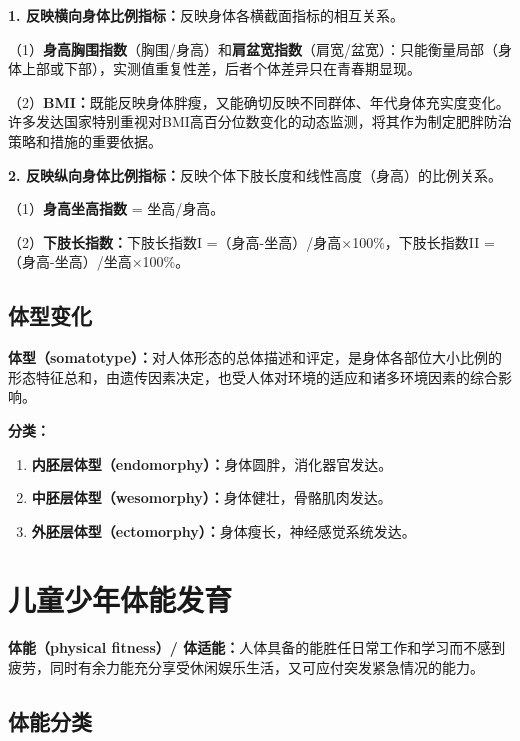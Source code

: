 \begin{keybox}
\textbf{1. 反映横向身体比例指标：}反映身体各横截面指标的相互关系。

（1）\textbf{身高胸围指数}（胸围/身高）和\textbf{肩盆宽指数}（肩宽/盆宽）：只能衡量局部（身体上部或下部），实测值重复性差，后者个体差异只在青春期显现。

（2）\textbf{BMI：}既能反映身体胖瘦，又能确切反映不同群体、年代身体充实度变化。许多发达国家特别重视对BMI高百分位数变化的动态监测，将其作为制定肥胖防治策略和措施的重要依据。

\textbf{2. 反映纵向身体比例指标：}反映个体下肢长度和线性高度（身高）的比例关系。

（1）\textbf{身高坐高指数} = 坐高/身高。

（2）\textbf{下肢长指数：}下肢长指数I =（身高-坐高）/身高×100\%，下肢长指数II =（身高-坐高）/坐高×100\%。
\end{keybox}

\subsection{体型变化}

\begin{defbox}
\textbf{体型（somatotype）：}对人体形态的总体描述和评定，是身体各部位大小比例的形态特征总和，由遗传因素决定，也受人体对环境的适应和诸多环境因素的综合影响。

\textbf{分类：}

\begin{enumerate}[leftmargin=*]
    \item \textbf{内胚层体型（endomorphy）：}身体圆胖，消化器官发达。
    \item \textbf{中胚层体型（wesomorphy）：}身体健壮，骨骼肌肉发达。
    \item \textbf{外胚层体型（ectomorphy）：}身体瘦长，神经感觉系统发达。
\end{enumerate}
\end{defbox}

\section{儿童少年体能发育}

\begin{defbox}
\textbf{体能（physical fitness）/ 体适能：}人体具备的能胜任日常工作和学习而不感到疲劳，同时有余力能充分享受休闲娱乐生活，又可应付突发紧急情况的能力。
\end{defbox}

\subsection{体能分类}

